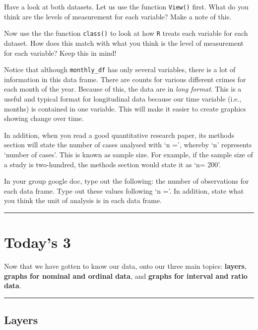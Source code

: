 \documentclass[
]{book}
\begin{document}
Have a look at both datasets. Let us use the function \texttt{View()} first. What do you think are the levels of measurement for each variable? Make a note of this.

Now use the the function \texttt{class()} to look at how \texttt{R} treats each variable for each dataset. How does this match with what you think is the level of measurement for each variable? Keep this in mind!

Notice that although \texttt{monthly\_df} has only several variables, there is a lot of information in this data frame. There are counts for various different crimes for each month of the year. Because of this, the data are in \emph{long format}. This is a useful and typical format for longitudinal data because our time variable (i.e., months) is contained in one variable. This will make it easier to create graphics showing change over time.

In addition, when you read a good quantitative research paper, its methods section will state the number of cases analysed with `n =', whereby `n' represents `number of cases'. This is known as sample size. For example, if the sample size of a study is two-hundred, the methods section would state it as `n= 200'.

In your group google doc, type out the following: the number of observations for each data frame. Type out these values following `n ='. In addition, state what you think the unit of analysis is in each data frame.

\begin{center}\rule{0.5\linewidth}{0.5pt}\end{center}

\hypertarget{todays-3}{%
\section{Today's 3}\label{todays-3}}

Now that we have gotten to know our data, onto our three main topics: \textbf{layers}, \textbf{graphs for nominal and ordinal data}, and \textbf{graphs for interval and ratio data}.

\begin{center}\rule{0.5\linewidth}{0.5pt}\end{center}

\hypertarget{layers}{%
\subsection{Layers}\label{layers}}
\end{document}
